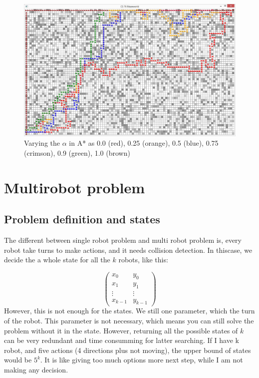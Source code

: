\documentclass{article}
\begin{document}
\begin{figure}[!h]
\centering
\includegraphics[width=1\textwidth]{s-2-1.JPG}
\caption{Varying the $\alpha$ in A* as 0.0 (red), 0.25 (orange), 0.5 (blue), 0.75 (crimson), 0.9 (green), 1.0 (brown)}
\label{s-2}
\end{figure}






\clearpage
\section{Multirobot problem}
\subsection{Problem definition and states}

The different between single robot problem and multi robot problem is, every robot take turns to make actions, and it needs collision detection. In thiscase, we decide the a whole state for all the $k$ robots, like this:



$$\begin{pmatrix}
x_0 & y_0 \\
x_1 & y_1 \\
\vdots & \vdots \\	
x_{k-1} & y_{k-1}
\end{pmatrix}$$
However, this is not enough for the states. We still one parameter, which the turn of the robot. This parameter is not necessary, which means you can still solve the problem without it in the state. However, returning all the possible states of $k$ can be very redundant and time consumming for latter searching. If I have k robot, and five actions (4 directions plus not moving), the upper bound of states would be $5^k$. It is like giving too much options more next step, while I am not making any decision.
\end{document}
